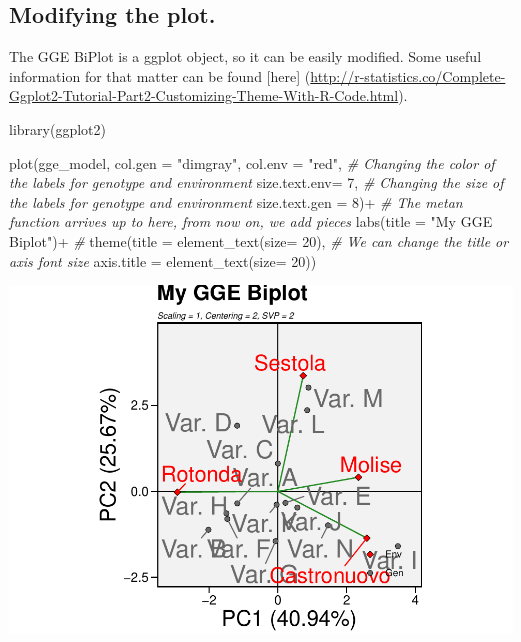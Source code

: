 \documentclass[
]{book}
\newenvironment{Shaded}{\begin{snugshade}}{\end{snugshade}}
\newcommand{\AttributeTok}[1]{\textcolor[rgb]{0.77,0.63,0.00}{#1}}
\newcommand{\CommentTok}[1]{\textcolor[rgb]{0.56,0.35,0.01}{\textit{#1}}}
\newcommand{\DecValTok}[1]{\textcolor[rgb]{0.00,0.00,0.81}{#1}}
\newcommand{\FunctionTok}[1]{\textcolor[rgb]{0.00,0.00,0.00}{#1}}
\newcommand{\NormalTok}[1]{#1}
\newcommand{\SpecialCharTok}[1]{\textcolor[rgb]{0.00,0.00,0.00}{#1}}
\newcommand{\StringTok}[1]{\textcolor[rgb]{0.31,0.60,0.02}{#1}}
\begin{document}
\hypertarget{modifying-the-plot.}{%
\subsection{Modifying the plot.}\label{modifying-the-plot.}}

The GGE BiPlot is a ggplot object, so it can be easily modified. Some useful information for that matter can be found {[}here{]} (\url{http://r-statistics.co/Complete-Ggplot2-Tutorial-Part2-Customizing-Theme-With-R-Code.html}).

\begin{Shaded}
\begin{Highlighting}[]
\FunctionTok{library}\NormalTok{(ggplot2)}

\FunctionTok{plot}\NormalTok{(gge\_model,}
     \AttributeTok{col.gen =} \StringTok{"dimgray"}\NormalTok{,  }
     \AttributeTok{col.env =} \StringTok{"red"}\NormalTok{,                            }\CommentTok{\# Changing the color of the labels for genotype and environment  }
     \AttributeTok{size.text.env=} \DecValTok{7}\NormalTok{,                           }\CommentTok{\# Changing the size of the labels for genotype and environment}
     \AttributeTok{size.text.gen =} \DecValTok{8}\NormalTok{)}\SpecialCharTok{+}                         \CommentTok{\# The metan function arrives up to here, from now on, we add pieces}
     \FunctionTok{labs}\NormalTok{(}\AttributeTok{title =} \StringTok{"My GGE Biplot"}\NormalTok{)}\SpecialCharTok{+}              \CommentTok{\# }
  \FunctionTok{theme}\NormalTok{(}\AttributeTok{title =} \FunctionTok{element\_text}\NormalTok{(}\AttributeTok{size=} \DecValTok{20}\NormalTok{),          }\CommentTok{\# We can change the title or axis font size}
        \AttributeTok{axis.title =} \FunctionTok{element\_text}\NormalTok{(}\AttributeTok{size=} \DecValTok{20}\NormalTok{)) }
\end{Highlighting}
\end{Shaded}

\includegraphics{PPB-Toolkit-for-R-and-R-Studio_files/figure-latex/unnamed-chunk-131-1.pdf}

  
\end{document}
